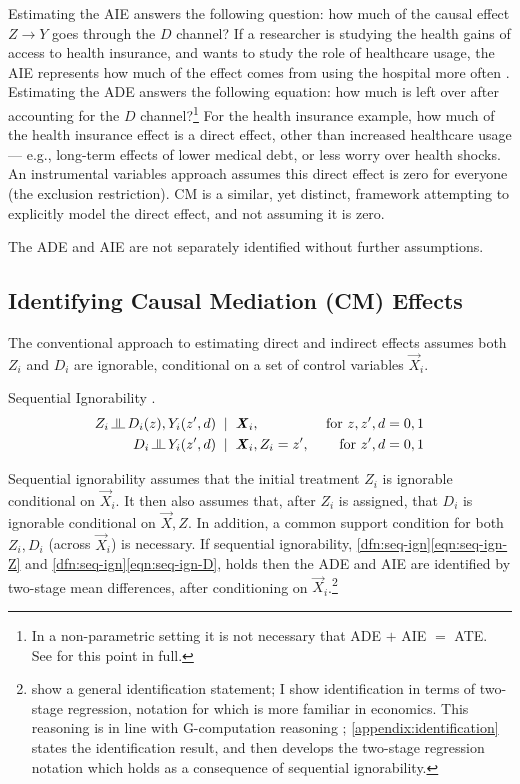 Estimating the AIE answers the following question: how much of the causal effect $Z \to Y$ goes through the $D$ channel?
If a researcher is studying the health gains of access to health insurance, and wants to study the role of healthcare usage, the AIE represents how much of the effect comes from using the hospital more often \citep{finkelstein2008oregon}.
Estimating the ADE answers the following equation: how much is left over after accounting for the $D$ channel?\footnote{
    In a non-parametric setting it is not necessary that ADE $+$ AIE $=$ ATE.
    See \cite{imai2010identification} for this point in full.
}
For the health insurance example, how much of the health insurance effect is a direct effect, other than increased healthcare usage --- e.g., long-term effects of lower medical debt, or less worry over health shocks.
An instrumental variables approach assumes this direct effect is zero for everyone (the exclusion restriction).
CM is a similar, yet distinct, framework attempting to explicitly model the direct effect, and not assuming it is zero.

The ADE and AIE are not separately identified without further assumptions.

\subsection{Identifying Causal Mediation (CM) Effects}
The conventional approach to estimating direct and indirect effects assumes both $Z_i$ and $D_i$ are ignorable, conditional on a set of control variables $\vec X_i$.
\begin{definition}
    \label{dfn:seq-ign}
    Sequential Ignorability \citep{imai2010identification}.
    \begin{align}
        \label{eqn:seq-ign-Z}
        Z_i \indep  D_i(z), Y_i(z', d) \;\; &| \;\; \vec X_i,
            &\textnormal{ for } z, z', d = 0, 1 \\
        \label{eqn:seq-ign-D}
        D_i \indep Y_i(z', d) \;\; &| \;\; \vec X_i, Z_i = z', 
            &\textnormal{ for } z', d = 0, 1
    \end{align}
\end{definition}
Sequential ignorability assumes that the initial treatment $Z_i$ is ignorable conditional on $\vec X_i$.
It then also assumes that, after $Z_i$ is assigned, that $D_i$ is ignorable conditional on $\vec X, Z$.
In addition, a common support condition for both $Z_i, D_i$ (across $\vec X_i$) is necessary.
If sequential ignorability, \ref{dfn:seq-ign}\eqref{eqn:seq-ign-Z} and \ref{dfn:seq-ign}\eqref{eqn:seq-ign-D}, holds then the ADE and AIE are identified by two-stage mean differences, after conditioning on $\vec X_i$.\footnote{
    \cite{imai2010identification} show a general identification statement; I show identification in terms of two-stage regression, notation for which is more familiar in economics.
    This reasoning is in line with G-computation reasoning \citep{robins1986g};
    \autoref{appendix:identification} states the \cite{imai2010identification} identification result, and then develops the two-stage regression notation which holds as a consequence of sequential ignorability.
}
\vspace{0.1cm}

